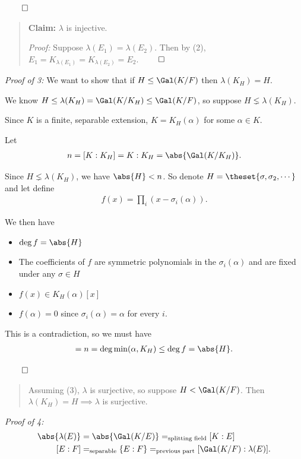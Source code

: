 \(\qed\)

\begin{quote}
\textbf{Claim:} \(\lambda\) is injective.

\emph{Proof:} Suppose \(\lambda(E_1) = \lambda(E_2)\). Then by (2),
\(E_1 = K_{\lambda(E_1)} = K_{\lambda(E_2)} = E_2\). \(\qed\)
\end{quote}

\emph{Proof of 3:} We want to show that if \(H\leq \Gal(K/F)\) then
\(\lambda(K_H) = H\).

We know \(H \leq \lambda(K_H) = \Gal(K/K_H) \leq \Gal(K/F)\), so suppose
\(H \lneq \lambda(K_H)\).

Since \(K\) is a finite, separable extension, \(K = K_H(\alpha)\) for
some \(\alpha \in K\).

Let \begin{align*}
n = [K: K_H] = {K: K_H} = \abs{\Gal(K/K_H)}
.\end{align*}

Since \(H \lneq \lambda(K_H)\), we have \(\abs{H} < n\). So denote
\(H = \theset{\sigma, \sigma_2, \cdots}\) and let define \begin{align*}
f(x) = \prod_i (x - \sigma_i(\alpha))
.\end{align*}

We then have

\begin{itemize}
\item
  \(\deg f = \abs{H}\)
\item
  The coefficients of \(f\) are symmetric polynomials in the
  \(\sigma_i(\alpha)\) and are fixed under any \(\sigma\in H\)
\item
  \(f(x) \in K_H(\alpha)[x]\)
\item
  \(f(\alpha) = 0\) since \(\sigma_i(\alpha) = \alpha\) for every \(i\).
\end{itemize}

This is a contradiction, so we must have
\begin{align*}
[K_H: K] = n = \deg \min(\alpha, K_H) \leq \deg f = \abs{H}
.\end{align*}

\(\qed\)

\begin{quote}
Assuming (3), \(\lambda\) is surjective, so suppose \(H < \Gal(K/F)\).
Then \(\lambda(K_H) = H \implies \lambda\) is surjective.
\end{quote}

\emph{Proof of 4:} \begin{align*}
\abs{\lambda(E)} &= \abs{\Gal(K/E)} =_{\text{splitting field}} [K: E]  \\
[E: F] &=_{\text{separable}} \{E: F\} =_{\text{previous part}} [\Gal(K/F): \lambda(E)]
.\end{align*}

